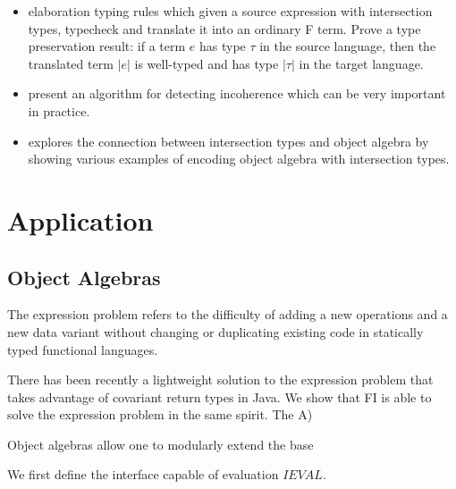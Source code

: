 \documentclass[preprint]{sigplanconf}
\begin{document}
\begin{itemize}

\item{elaboration typing rules which given a source expression with intersection
    types, typecheck and translate it into an ordinary F term. Prove a type
    preservation result: if a term $e$ has type $\tau$ in the source language,
    then the translated term $|e|$ is well-typed and has type $|\tau|$ in the
    target language.}

\item{present an algorithm for detecting incoherence which can be very important
    in practice.}

\item{explores the connection between intersection types and object algebra by
    showing various examples of encoding object algebra with intersection
    types.}

\end{itemize}



\section{Application}

\subsection{Object Algebras}


The expression problem refers to the difficulty of adding a new operations and a
new data variant without changing or duplicating existing code in statically
typed functional languages.

There has been recently a lightweight solution to the expression problem that
takes advantage of covariant return types in Java. We show that FI is able to
solve the expression problem in the same spirit. The
A)


Object algebras allow one to modularly extend the base

We first define the interface capable of evaluation $ IEVAL $.

\end{document}
